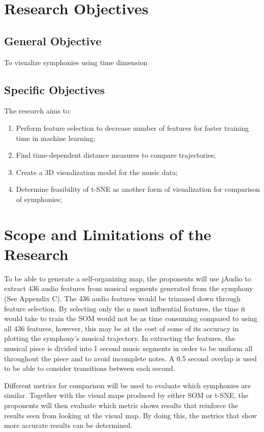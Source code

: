 \section{Research Objectives}
\label{sec:researchobjectives}
\subsection{General Objective}
\label{sec:generalobjective}
To visualize symphonies using time dimension
\subsection{Specific Objectives}
\label{sec:specificobjectives}
The research aims to:
\begin{enumerate}
\item Perform feature selection to decrease number of features for faster training time in machine learning;
\item Find time-dependent distance measures to compare trajectories;
\item Create a 3D visualization model for the music data;
\item Determine feasibility of t-SNE as another form of visualization for comparison of symphonies;
\end{enumerate}
\section{Scope and Limitations of the Research}
\label{sec:scopelimitations}
To be able to generate a self-organizing map, the proponents will use jAudio to extract 436 audio features from musical segments generated from the symphony (See Appendix C). The 436 audio features would be trimmed down through feature selection. By selecting only the n most influential features, the time it would take to train the SOM would not be as time consuming compared to using all 436 features, however, this may be at the cost of some of its accuracy in plotting the symphony’s musical trajectory. In extracting the features, the musical piece is divided into 1 second music segments in order to be uniform all throughout the piece and to avoid incomplete notes. A 0.5 second overlap is used to be able to consider transitions between each second. 

Different metrics for comparison will be used to evaluate which symphonies are similar. Together with the visual maps produced by either SOM or t-SNE, the proponents will then evaluate which metric shows results that reinforce the results seen from looking at the visual map. By doing this, the metrics that show more accurate results can be determined.

